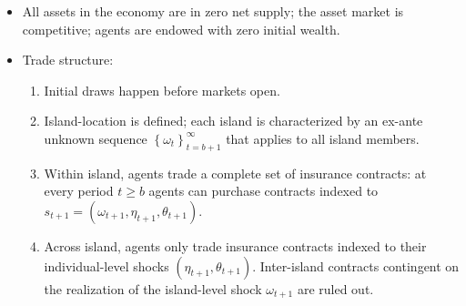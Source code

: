 \documentclass[notes=show]{beamer}
\begin{document}
\begin{frame}%



\begin{itemize}
\item All assets in the economy are in zero net supply; the asset market is
competitive; agents are endowed with zero initial wealth.

\item Trade structure:

\begin{enumerate}
\item Initial draws happen before markets open.

\item Island-location is defined; each island is characterized by an ex-ante
unknown sequence $\left\{ \omega _{t}\right\} _{t=b+1}^{\infty }$ that
applies to all island members.

\item Within island, agents trade a complete set of insurance contracts: at
every period $t\geq b$ agents can purchase contracts indexed to $%
s_{t+1}=\left( \omega _{t+1},\eta _{t+1},\theta _{t+1}\right) $.

\item Across island, agents only trade insurance contracts indexed to their
individual-level shocks $\left( \eta _{t+1},\theta _{t+1}\right) $.
Inter-island contracts contingent on the realization of the island-level
shock $\omega _{t+1}$ are ruled out.
\end{enumerate}
\end{itemize}

\transboxout%
\end{frame}%

\bigskip
\end{document}
